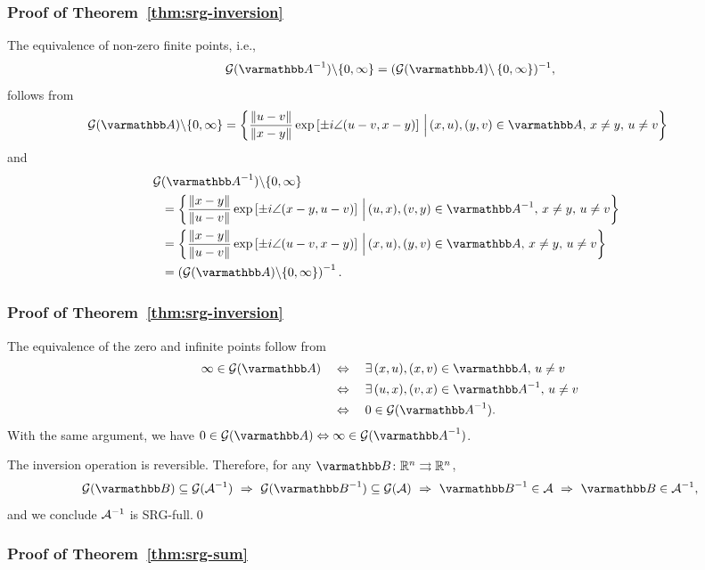 \documentclass[10pt,mathserif]{beamer}
\begin{document}
\begin{frame}[fragile]
\frametitle{Proof of Theorem~\ref{thm:srg-inversion}}
The equivalence of non-zero finite points, i.e.,
\[
\cG(\opA^{-1})\backslash\{0,\infty\}=\left(\cG(\opA)\right\backslash\{0,\infty\})^{-1},
\]
follows from
\begingroup\makeatletter\def\f@size{9}\check@mathfonts
\begin{align*}
\!\!\!\!\!\!
\mathcal{G}(\opA)\backslash\{0,\infty\}&=
\left\{
\frac{\|u-v\|}{\|x-y\|}
\exp\left[\pm i \angle (u-v,x-y)\right]
\,\Big|\,
(x,u),(y,v)\in \opA,\, x\ne y,\,u\ne v \right\}
\end{align*}
\endgroup
and
\begin{align*}
&\!\!\!\!\mathcal{G}(\opA^{-1})\backslash\{0,\infty\}\\
&=
\left\{
\frac{\|x-y\|}{\|u-v\|}
\exp\left[\pm i \angle (x-y,u-v)\right]
\,\Big|\,
(u,x),(v,y)\in \opA^{-1},\, x\ne y,\,u\ne v \right\}\\
&=
\left\{
\frac{\|x-y\|}{\|u-v\|}
\exp\left[\pm i \angle (u-v,x-y)\right]
\,\Big|\,
(x,u),(y,v)\in \opA,\, x\ne y,\,u\ne v \right\}\\
&=\left(\cG(\opA)\backslash\{0,\infty\}\right)^{-1}.
\end{align*}
\end{frame}

\begin{frame}
\frametitle{Proof of Theorem~\ref{thm:srg-inversion}}
The equivalence of the zero and infinite points follow from
\begin{align*}
\infty\in \cG(\opA)
&\quad\Leftrightarrow\quad
\exists\, (x,u),(x,v)\in \opA,\,u\ne v\\
&\quad\Leftrightarrow\quad
\exists\, (u,x),(v,x)\in \opA^{-1},\,u\ne v\\
&\quad\Leftrightarrow\quad
0\in \cG(\opA^{-1}).
\end{align*}
With the same argument, we have
$0\in \cG(\opA)
\Leftrightarrow
\infty\in \cG(\opA^{-1})$.
\vspace{0.2in}


The inversion operation is reversible.
Therefore, for any $\opB\colon\reals^n\rightrightarrows\reals^n$,
\[
\cG(\opB)\subseteq \cG( \cA^{-1})
\,\,\Rightarrow\,\,
\cG(\opB^{-1})\subseteq \cG(\cA)
\,\,\Rightarrow\,\,
\opB^{-1}\in \cA
\,\,\Rightarrow\,\,
\opB\in\cA^{-1},
\]
and we conclude ${\mathcal{A}}^{-1}$ is SRG-full.\qed
\end{frame}

\begin{frame}
\frametitle{Proof of Theorem~\ref{thm:srg-sum}}

\end{frame}
\end{document}
